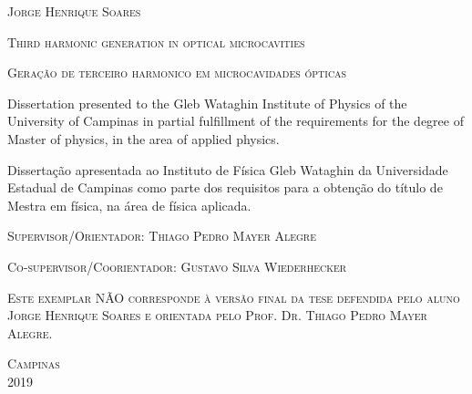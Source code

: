 \newpage
\thispagestyle{empty}

\vspace*{0.6cm}
\begin{center}
\textsc{\large Jorge Henrique Soares}
\end{center}


\vspace*{0.6cm}

\begin{center}
\textsc{\Large Third harmonic generation in optical microcavities}
\end{center}

\vspace*{0.3cm}

\begin{center}
\textsc{\large Geração de terceiro harmonico em microcavidades ópticas}
\end{center}

\vspace*{0.6cm}

\begin{flushright}
\begin{minipage}{8.0cm}
Dissertation presented to the Gleb Wataghin Institute of Physics of the University of Campinas in partial fulfillment of the requirements for the degree of Master of physics, in the area of applied physics.
\vspace*{0.3cm}

Dissertação apresentada ao Instituto de Física Gleb Wataghin da Universidade Estadual de Campinas como parte dos requisitos para a obtenção do título de Mestra em física, na área de física aplicada.
\end{minipage}
\end{flushright}

\vspace*{0.8cm}
\begin{flushleft}
	\hspace{0.3cm} \textsc{Supervisor/Orientador: Thiago Pedro Mayer Alegre}
	
	\hspace{0.3cm} \textsc{Co-supervisor/Coorientador: Gustavo Silva Wiederhecker}
\end{flushleft}

\vspace*{0.5cm}

\begin{minipage}{7cm}
\scriptsize \textsc{Este exemplar NÃO corresponde à versão final da tese defendida pelo aluno Jorge Henrique Soares e orientada pelo Prof. Dr. Thiago Pedro Mayer Alegre.}
\end{minipage}

\vspace*{0.5cm}

\null \vfill
\begin{center}
\textsc{\large Campinas\\2019}
\end{center}




